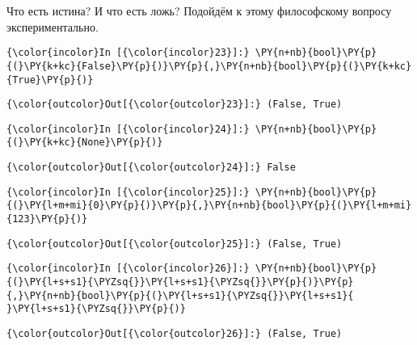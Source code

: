     Что есть истина? И что есть ложь? Подойдём к этому философскому вопросу
экспериментально.

    \begin{Verbatim}[commandchars=\\\{\}]
{\color{incolor}In [{\color{incolor}23}]:} \PY{n+nb}{bool}\PY{p}{(}\PY{k+kc}{False}\PY{p}{)}\PY{p}{,}\PY{n+nb}{bool}\PY{p}{(}\PY{k+kc}{True}\PY{p}{)}
\end{Verbatim}

            \begin{Verbatim}[commandchars=\\\{\}]
{\color{outcolor}Out[{\color{outcolor}23}]:} (False, True)
\end{Verbatim}
        
    \begin{Verbatim}[commandchars=\\\{\}]
{\color{incolor}In [{\color{incolor}24}]:} \PY{n+nb}{bool}\PY{p}{(}\PY{k+kc}{None}\PY{p}{)}
\end{Verbatim}

            \begin{Verbatim}[commandchars=\\\{\}]
{\color{outcolor}Out[{\color{outcolor}24}]:} False
\end{Verbatim}
        
    \begin{Verbatim}[commandchars=\\\{\}]
{\color{incolor}In [{\color{incolor}25}]:} \PY{n+nb}{bool}\PY{p}{(}\PY{l+m+mi}{0}\PY{p}{)}\PY{p}{,}\PY{n+nb}{bool}\PY{p}{(}\PY{l+m+mi}{123}\PY{p}{)}
\end{Verbatim}

            \begin{Verbatim}[commandchars=\\\{\}]
{\color{outcolor}Out[{\color{outcolor}25}]:} (False, True)
\end{Verbatim}
        
    \begin{Verbatim}[commandchars=\\\{\}]
{\color{incolor}In [{\color{incolor}26}]:} \PY{n+nb}{bool}\PY{p}{(}\PY{l+s+s1}{\PYZsq{}}\PY{l+s+s1}{\PYZsq{}}\PY{p}{)}\PY{p}{,}\PY{n+nb}{bool}\PY{p}{(}\PY{l+s+s1}{\PYZsq{}}\PY{l+s+s1}{ }\PY{l+s+s1}{\PYZsq{}}\PY{p}{)}
\end{Verbatim}

            \begin{Verbatim}[commandchars=\\\{\}]
{\color{outcolor}Out[{\color{outcolor}26}]:} (False, True)
\end{Verbatim}
        
